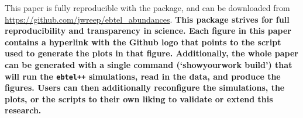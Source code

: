 \documentclass[twocolumn]{aastex631}
\begin{document}
This paper is fully reproducible with the \href{https://github.com/showyourwork/showyourwork}{\showyourwork} package, and can be downloaded from \url{https://github.com/jwreep/ebtel_abundances}.  \textbf{This package strives for full reproducibility and transparency in science.  Each figure in this paper contains a hyperlink with the Github logo that points to the script used to generate the plots in that figure.  Additionally, the whole paper can be generated with a single command (`showyourwork build') that will run the \texttt{ebtel++} simulations, read in the data, and produce the figures.  Users can then additionally reconfigure the simulations, the plots, or the scripts to their own liking to validate or extend this research.}




\end{document}
